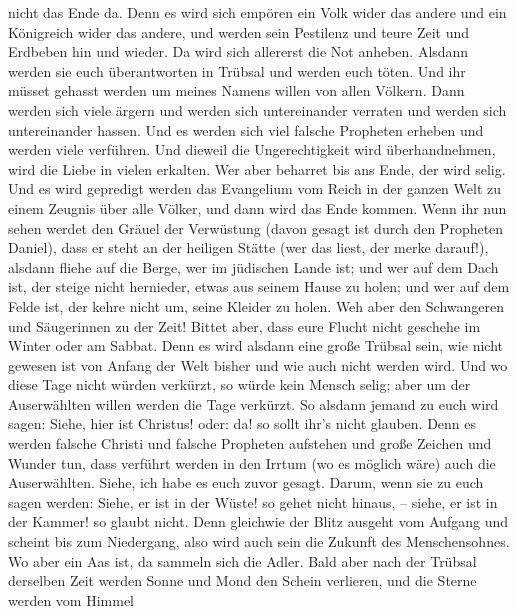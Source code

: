 nicht das Ende da.  Denn es wird sich empören ein Volk wider
das andere und ein Königreich wider das andere, und werden sein
Pestilenz und teure Zeit und Erdbeben hin und wieder.  Da
wird sich allererst die Not anheben.  Alsdann werden sie
euch überantworten in Trübsal und werden euch töten. Und ihr müsset
gehasst werden um meines Namens willen von allen Völkern. 
Dann werden sich viele ärgern und werden sich untereinander verraten und
werden sich untereinander hassen.  Und es werden sich viel
falsche Propheten erheben und werden viele verführen.  Und
dieweil die Ungerechtigkeit wird überhandnehmen, wird die Liebe in
vielen erkalten.  Wer aber beharret bis ans Ende, der wird
selig.  Und es wird gepredigt werden das Evangelium vom
Reich in der ganzen Welt zu einem Zeugnis über alle Völker, und dann
wird das Ende kommen.  Wenn ihr nun sehen werdet den Gräuel
der Verwüstung (davon gesagt ist durch den Propheten Daniel), dass er
steht an der heiligen Stätte (wer das liest, der merke darauf!),
 alsdann fliehe auf die Berge, wer im jüdischen Lande ist;
 und wer auf dem Dach ist, der steige nicht hernieder,
etwas aus seinem Hause zu holen;  und wer auf dem Felde
ist, der kehre nicht um, seine Kleider zu holen.  Weh aber
den Schwangeren und Säugerinnen zu der Zeit!  Bittet aber,
dass eure Flucht nicht geschehe im Winter oder am Sabbat. 
Denn es wird alsdann eine große Trübsal sein, wie nicht gewesen ist von
Anfang der Welt bisher und wie auch nicht werden wird.  Und
wo diese Tage nicht würden verkürzt, so würde kein Mensch selig; aber um
der Auserwählten willen werden die Tage verkürzt.  So
alsdann jemand zu euch wird sagen: Siehe, hier ist Christus! oder: da!
so sollt ihr's nicht glauben.  Denn es werden falsche
Christi und falsche Propheten aufstehen und große Zeichen und Wunder
tun, dass verführt werden in den Irrtum (wo es möglich wäre) auch die
Auserwählten.  Siehe, ich habe es euch zuvor gesagt.
 Darum, wenn sie zu euch sagen werden: Siehe, er ist in der
Wüste! so gehet nicht hinaus, -- siehe, er ist in der Kammer! so glaubt
nicht.  Denn gleichwie der Blitz ausgeht vom Aufgang und
scheint bis zum Niedergang, also wird auch sein die Zukunft des
Menschensohnes.  Wo aber ein Aas ist, da sammeln sich die
Adler.  Bald aber nach der Trübsal derselben Zeit werden
Sonne und Mond den Schein verlieren, und die Sterne werden vom Himmel
